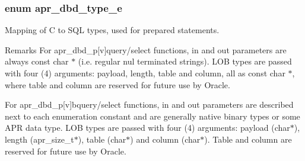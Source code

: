 \subsubsection[{\texorpdfstring{apr\+\_\+dbd\+\_\+type\+\_\+e}{apr_dbd_type_e}}]{\setlength{\rightskip}{0pt plus 5cm}enum {\bf apr\+\_\+dbd\+\_\+type\+\_\+e}}\hypertarget{group__APR__Util__DBD_ga19608fa5d518a5121bee23daacc5c230}{}\label{group__APR__Util__DBD_ga19608fa5d518a5121bee23daacc5c230}
Mapping of C to S\+QL types, used for prepared statements. \begin{DoxyRemark}{Remarks}
For apr\+\_\+dbd\+\_\+p\mbox{[}v\mbox{]}query/select functions, in and out parameters are always const char $\ast$ (i.\+e. regular nul terminated strings). L\+OB types are passed with four (4) arguments\+: payload, length, table and column, all as const char $\ast$, where table and column are reserved for future use by Oracle. 

For apr\+\_\+dbd\+\_\+p\mbox{[}v\mbox{]}bquery/select functions, in and out parameters are described next to each enumeration constant and are generally native binary types or some A\+PR data type. L\+OB types are passed with four (4) arguments\+: payload (char$\ast$), length (apr\+\_\+size\+\_\+t$\ast$), table (char$\ast$) and column (char$\ast$). Table and column are reserved for future use by Oracle. 
\end{DoxyRemark}
